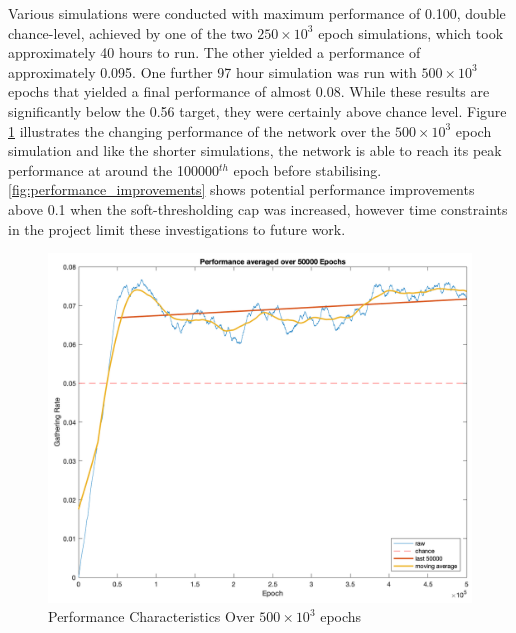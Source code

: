 \documentclass[11pt, twocolumn]{article}
\begin{document}
Various simulations were conducted with maximum performance of 0.100, double chance-level, achieved by one of the two $250\times10^3$ epoch simulations, which took approximately 40 hours to run. The other yielded a performance of approximately 0.095. One further 97 hour simulation was run with $500\times10^3$ epochs that yielded a final performance of almost 0.08. While these results are significantly below the 0.56 target, they were certainly above chance level. Figure \ref{fig:performance_500k} illustrates the changing performance of the network over the $500\times10^3$ epoch simulation and like the shorter simulations, the network is able to reach its peak performance at around the 100000$^{th}$ epoch before stabilising. \ref{fig:performance_improvements} shows potential performance improvements above 0.1 when the soft-thresholding cap was increased, however time constraints in the project limit these investigations to future work.

\begin{figure}[H]
	\centering
	\includegraphics[width=\linewidth]{performance_500k}
	\caption{Performance Characteristics Over $500\times10^3$ epochs}
	\label{fig:performance_500k}
\end{figure}
\end{document}

